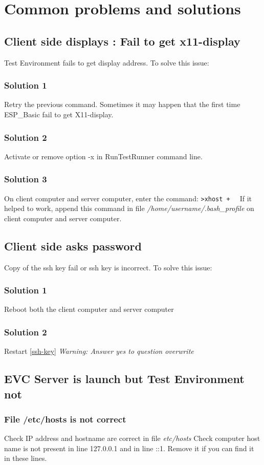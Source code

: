 \chapter{Common problems and solutions}
\section{Client side displays : Fail to get x11-display}
Test Environment fails to get display address. To solve this issue:
\subsection{Solution 1}
Retry the previous command. Sometimes it may happen that the first time ESP\_Basic fail to get X11-display.
\subsection{Solution 2}
Activate or remove option -x in RunTestRunner command line.
\subsection{Solution 3}
On client computer and server computer, enter the command:
\newline
\verb|>xhost +  | 
\newline
If it helped to work, append this command in file \emph{/home/{username}/.bash\_profile} on client computer and server computer.
\section{Client side asks password}
Copy of the ssh key fail or ssh key is incorrect. To solve this issue:
\subsection{Solution 1}
Reboot both the client computer and server computer
\subsection{Solution 2}
Restart \ref{ssh-key}
\newline
\emph{Warning: Answer yes to question overwrite}
\section{EVC Server is launch but Test Environment not}
\subsection{File /etc/hosts is not correct}
Check IP address and hostname are correct in file \emph{etc/hosts}
\newline
Check computer host name is not present in line 127.0.0.1 and in line ::1. Remove it if you can find it in these lines.
